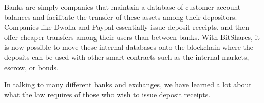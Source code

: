 Banks are simply companies that maintain a database of customer account
balances and facilitate the transfer of these assets among their depositors.
Companies like Dwolla and Paypal essentially issue deposit receipts, and then
offer cheaper transfers among their users than between banks. With BitShares,
it is now possible to move these internal databases onto the blockchain where
the deposits can be used with other smart contracts such as the internal
markets, escrow, or bonds.

In talking to many different banks and exchanges, we have learned a lot about
what the law requires of those who wish to issue deposit receipts.
